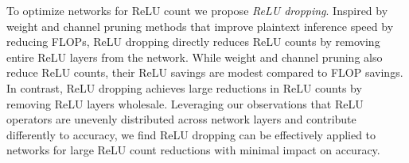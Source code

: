 
To optimize networks for ReLU count we propose \emph{ReLU dropping}.
Inspired by weight and channel pruning methods that improve plaintext inference speed by reducing FLOPs, 
ReLU dropping directly reduces ReLU counts by removing entire ReLU layers from the network.
While weight and channel pruning also reduce ReLU counts, their ReLU savings are modest compared to FLOP savings.
In contrast, ReLU dropping achieves large reductions in ReLU counts by 
removing ReLU layers wholesale.
Leveraging our observations that
ReLU operators are unevenly distributed across network layers and
contribute differently to accuracy, we find ReLU dropping can be effectively 
applied to networks for large ReLU count reductions with minimal impact on accuracy.





